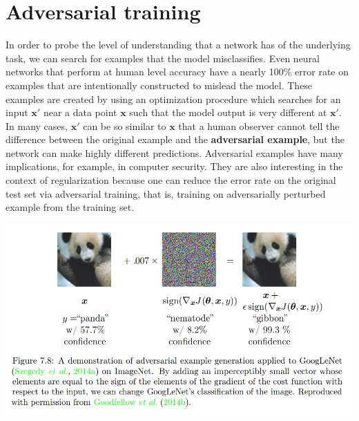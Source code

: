 \section{Adversarial training}
In order to probe the level of understanding that a network has of the underlying task, we can search for examples that the model misclassifies. Even neural networks that perform at human level accuracy have a nearly 100\% error rate on examples that are intentionally constructed to mislead the model. These examples are created by using an optimization procedure which searches for an input $\textbf{x}'$ near a data point $\textbf{x}$ such that the model output is very different at $\textbf{x}'$. In many cases, $\textbf{x}'$ can be so similar to $\textbf{x}$ that a
human observer cannot tell the difference between the original example and the \textbf{adversarial example}, but the network can make highly different predictions. Adversarial examples have many implications, for example, in computer security. They are also interesting in the context of regularization because one can reduce the error rate on the original test set via adversarial training, that is, training on adversarially perturbed example from the training set.
\begin{center}
    \includegraphics[scale=0.8]{images/Adversarial.png}
\end{center}

